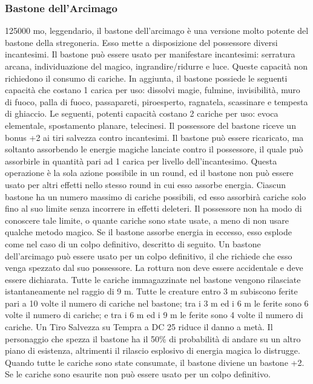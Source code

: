 \begin{multicols}{2}
	\subsubsection*{Bastone dell'Arcimago}
	125000 mo, leggendario, il bastone dell'arcimago è una versione molto potente del bastone della stregoneria. Esso mette a disposizione del possessore diversi incantesimi. Il bastone può essere usato per manifestare incantesimi: serratura arcana, individuazione del magico, ingrandire/ridurre e luce. Queste capacità non richiedono il consumo di cariche. In aggiunta, il bastone possiede le seguenti capacità che costano 1 carica per uso: dissolvi magie, fulmine, invisibilità, muro di fuoco, palla di fuoco, passapareti, piroesperto, ragnatela, scassinare e tempesta di ghiaccio. Le seguenti, potenti capacità costano 2 cariche per uso: evoca elementale, spostamento planare, telecinesi. Il possessore del bastone riceve un bonus +2 ai tiri salvezza contro incantesimi. Il bastone può essere ricaricato, ma soltanto assorbendo le energie magiche lanciate contro il possessore, il quale può assorbirle in quantità pari ad 1 carica per livello dell'incantesimo. Questa operazione è la sola azione possibile in un round, ed il bastone non può essere usato per altri effetti nello stesso round in cui esso assorbe energia. Ciascun bastone ha un numero massimo di cariche possibili, ed esso assorbirà cariche solo fino al suo limite senza incorrere in effetti deleteri. Il possessore non ha modo di conoscere tale limite, o quante cariche sono state usate, a meno di non usare qualche metodo magico. Se il bastone assorbe energia in eccesso, esso esplode come nel caso di un colpo definitivo, descritto di seguito. Un bastone dell'arcimago può essere usato per un colpo definitivo, il che richiede che esso venga spezzato dal suo possessore. La rottura non deve essere accidentale e deve essere dichiarata. Tutte le cariche immagazzinate nel bastone vengono rilasciate istantaneamente nel raggio di 9 m. Tutte le creature entro 3 m subiscono ferite pari a 10 volte il numero di cariche nel bastone; tra i 3 m ed i 6 m le ferite sono 6 volte il numero di cariche; e tra i 6 m ed i 9 m le ferite sono 4 volte il numero di cariche. Un Tiro Salvezza su Tempra a DC 25 riduce il danno a metà. Il personaggio che spezza il bastone ha il 50\% di probabilità di andare su un altro piano di esistenza, altrimenti il rilascio esplosivo di energia magica lo distrugge. Quando tutte le cariche sono state consumate, il bastone diviene un bastone +2. Se le cariche sono esaurite non può essere usato per un colpo definitivo.


\end{multicols}
